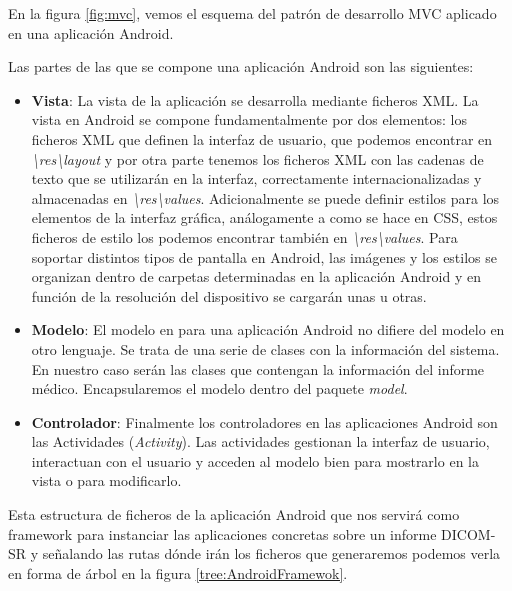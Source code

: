 En la figura \ref{fig:mvc}, vemos el esquema del patrón de desarrollo MVC aplicado en una aplicación Android.\par
Las partes de las que se compone una aplicación Android son las siguientes:
\begin{itemize}
\item \textbf{Vista}: La vista de la aplicación se desarrolla mediante ficheros XML. La vista en Android se compone fundamentalmente por dos elementos: los ficheros XML que definen la interfaz de usuario, que podemos encontrar en \emph{\textbackslash{res}\textbackslash{layout}} y por otra parte tenemos los ficheros XML con las cadenas de texto que se utilizarán en la interfaz, correctamente internacionalizadas y almacenadas en \emph{\textbackslash{res}\textbackslash{values}}. Adicionalmente se puede definir estilos para los elementos de la interfaz gráfica, análogamente a como se hace en CSS, estos ficheros de estilo los podemos encontrar también en \emph{\textbackslash{res}\textbackslash{values}}. Para soportar distintos tipos de pantalla en Android, las imágenes y los estilos se organizan dentro de carpetas determinadas en la aplicación Android y en función de la resolución del dispositivo se cargarán unas u otras.
\item \textbf{Modelo}: El modelo en para una aplicación Android no difiere del modelo en otro lenguaje. Se trata de una serie de clases con la información del sistema. En nuestro caso serán las clases que contengan la información del informe médico. Encapsularemos el modelo dentro del paquete \emph{model}.
\item \textbf{Controlador}: Finalmente los controladores en las aplicaciones Android son las Actividades (\emph{Activity}). Las actividades gestionan la interfaz de usuario, interactuan con el usuario y acceden al modelo bien para mostrarlo en la vista o para modificarlo. 
\end{itemize}

Esta estructura de ficheros de la aplicación Android que nos servirá como framework para instanciar las aplicaciones concretas sobre un informe DICOM-SR y señalando las rutas dónde irán los ficheros que generaremos podemos verla en forma de árbol en la figura \ref{tree:AndroidFramewok}.\par

